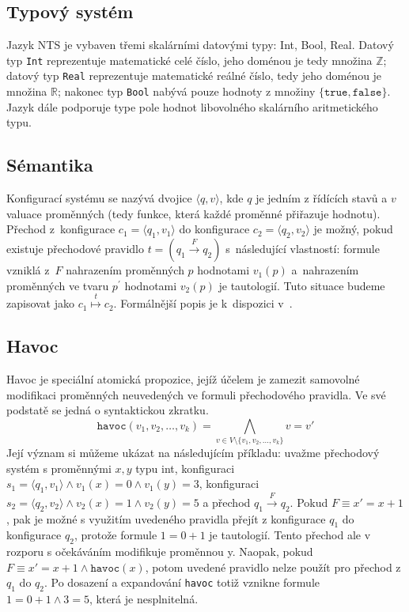 \documentclass{fithesis2}
\newcommand{\tuple}[1]{\langle #1 \rangle}
\begin{document}
\subsection{Typový systém}
Jazyk NTS je vybaven třemi skalárními datovými typy: Int, Bool, Real. Datový typ \texttt{Int} reprezentuje matematické celé číslo, jeho doménou je tedy množina $\mathbb{Z}$; datový typ \texttt{Real} reprezentuje matematické reálné číslo, tedy jeho doménou je množina $\mathbb{R}$; nakonec typ \texttt{Bool} nabývá pouze hodnoty z množiny $\{ \texttt{true}, \texttt{false} \}$. Jazyk dále podporuje type pole hodnot libovolného skalárního aritmetického typu.

\subsection{Sémantika}
\label{subsec:nts-configuration}

\newcommand{\rulemapsto}[1]{\overset{#1}{\mapsto}}
Konfigurací systému se nazývá dvojice $\tuple{q, v}$, kde $q$ je jedním z řídících stavů a $v$ valuace proměnných (tedy funkce, která každé proměnné přiřazuje hodnotu). Přechod z~konfigurace $c_1 = \tuple{q_1, v_1}$ do konfigurace $c_2 = \tuple{q_2, v_2}$ je možný, pokud existuje přechodové pravidlo $t = \left({q_1 \overset{F}{\rightarrow} q_2}\right)$ s~následující vlastností: formule vzniklá z~$F$ nahrazením proměnných $p$ hodnotami $v_1(p)$ a~nahrazením proměnných ve tvaru $p^\prime$ hodnotami $v_2(p)$ je tautologií. Tuto situace budeme zapisovat jako $c_1 \rulemapsto{t} c_2$. Formálnější popis je k~dispozici v~\cite{NTSref}.

\subsection{Havoc}
\label{subsec:nts-havoc}
Havoc je speciální atomická propozice, jejíž účelem je zamezit samovolné modifikaci proměnných neuvedených ve formuli přechodového pravidla. Ve své podstatě se jedná o syntaktickou zkratku.
\begin{equation}
\texttt{havoc} \left( v_1, v_2, \ldots, v_k \right) = \bigwedge_{v \in V \setminus \{ v_1, v_2, \ldots, v_k \}} v = v\prime
\end{equation}
Její význam si můžeme ukázat na následujícím příkladu: uvažme přechodový systém s proměnnými $x,y$ typu int, konfiguraci $s_1 = \tuple{q_1, v_1} \land v_1(x) = 0 \land v_1(y) = 3$, konfiguraci $s_2 = \tuple{q_2, v_2} \land v_2(x) = 1 \land v_2(y) = 5$ a přechod $q_1 \overset{F}{\rightarrow} q_2$. Pokud $F \equiv x' = x + 1$, pak je možné s využitím uvedeného pravidla přejít z konfigurace $q_1$ do konfigurace $q_2$, protože formule $1 = 0 + 1$ je tautologií. Tento přechod ale v rozporu s očekáváním modifikuje proměnnou y. Naopak, pokud $F \equiv x' = x + 1 \land \texttt{havoc}(x)$, potom uvedené pravidlo nelze použít pro přechod z $q_1$ do $q_2$. Po dosazení a expandování \texttt{havoc} totiž vznikne formule $1 = 0 + 1 \land 3 = 5$, která je nesplnitelná.
\end{document}
